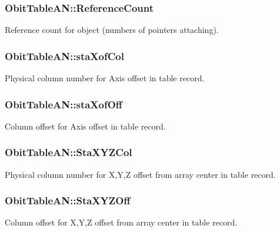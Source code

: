 \subsubsection{ {\bf Obit\-Table\-AN::Reference\-Count}}\label{structObitTableAN_o2}


Reference count for object (numbers of pointers attaching). 

\subsubsection{ {\bf Obit\-Table\-AN::sta\-Xof\-Col}}\label{structObitTableAN_o47}


Physical column number for Axis offset in table record. 

\subsubsection{ {\bf Obit\-Table\-AN::sta\-Xof\-Off}}\label{structObitTableAN_o46}


Column offset for Axis offset in table record. 

\subsubsection{ {\bf Obit\-Table\-AN::Sta\-XYZCol}}\label{structObitTableAN_o55}


Physical column number for X,Y,Z offset from array center in table record. 

\subsubsection{ {\bf Obit\-Table\-AN::Sta\-XYZOff}}\label{structObitTableAN_o54}


Column offset for X,Y,Z offset from array center in table record. 

